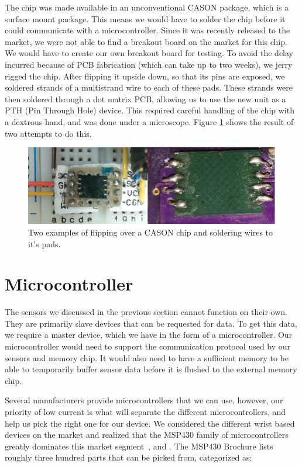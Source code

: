 The chip was made available in an unconventional CASON package,
which is a surface mount package.
This means we would have to solder the chip before it could communicate with a microcontroller.
Since it was recently released to the market,
we were not able to find a breakout board on the market for this chip.
We would have to create our own breakout board for testing.
To avoid the delay incurred because of PCB fabrication (which can take up to two weeks), we jerry rigged the chip. After flipping it upside down, so that its pins are exposed, we soldered strands of a multistrand wire to each of these pads. These strands were then soldered through a dot matrix PCB, allowing us to use the new unit as a PTH (Pin Through Hole) device. This required careful handling of the chip with a dextrous hand, and was done under a microscope. Figure \ref{Fig:CASON} shows the result of two attempts to do this. 

\begin{figure}
\begin{center}
\includegraphics[width=1.0\textwidth]{images/CASON.jpg}
\caption{Two examples of flipping over a CASON chip and soldering wires to it's pads.}
\label{Fig:CASON}
\end{center}
\end{figure}
 

\section{Microcontroller}
\label{Sec:MicroController}

The sensors we discussed in the previous section cannot function on their own. They are primarily slave devices that can be requested for data. To get this data, we require a master device, which we have in the form of a microcontroller. Our microcontroller would need to support the communication protocol used by our sensors and memory chip. It would also need to have a sufficient memory to be able to temporarily buffer sensor data before it is flushed to the external memory chip. 

Several manufacturers provide microcontrollers that we can use, however,
our priority of low current is what will separate the different microcontrollers,
and help us pick the right one for our device.
We considered the different wrist based devices on the market and realized that the MSP430 family of microcontrollers greatly dominates this market segment~\cite{lo2005body}, \cite{polastre2005telos} and \cite{werner2006deploying}.
The MSP430 Brochure \cite{instruments2009msp430} lists roughly three hundred parts that can be picked from, categorized as:

